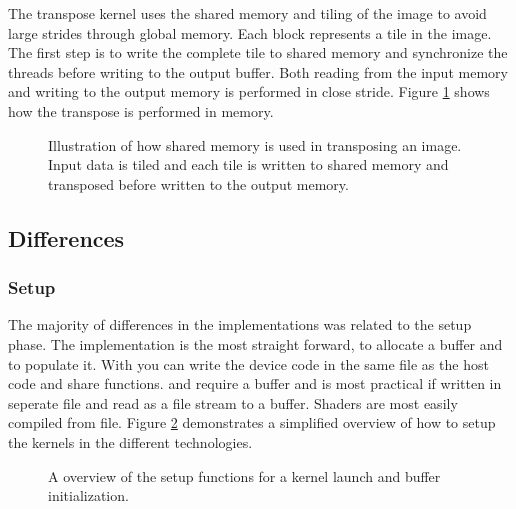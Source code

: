 The transpose kernel uses the shared memory and tiling of the image to avoid large strides through global memory. Each block represents a tile in the image. The first step is to write the complete tile to shared memory and synchronize the threads before writing to the output buffer. Both reading from the input memory and writing to the output memory is performed in close stride. Figure \ref{fig:transpose-memory} shows how the transpose is performed in memory.

\begin{figure}[H]
	\centering
	
	\caption{Illustration of how shared memory is used in transposing an image. Input data is tiled and each tile is written to shared memory and transposed before written to the output memory. }
	\label{fig:transpose-memory}
\end{figure}

\subsection{Differences}%
\subsubsection{Setup}%
The majority of differences in the implementations was related to the setup phase. The {\CU} implementation is the most straight forward,  to allocate a buffer and  to populate it. With {\CU} you can write the device code in the same file as the host code and share functions. {\OCL} and {\GL} require a  buffer and is most practical if written in seperate file and read as a file stream to a  buffer. {\DX} Shaders are most easily compiled from file. Figure \ref{fig:code:setup} demonstrates a simplified overview of how to setup the kernels in the different technologies.

\begin{figure}
	\centering
	\def \setupWidth {\textwidth / 2 - 20pt}	
	\hfill
	\newline
	\hfill
	\caption{A overview of the setup functions for a kernel launch and buffer initialization.}
	\label{fig:code:setup}
\end{figure}

